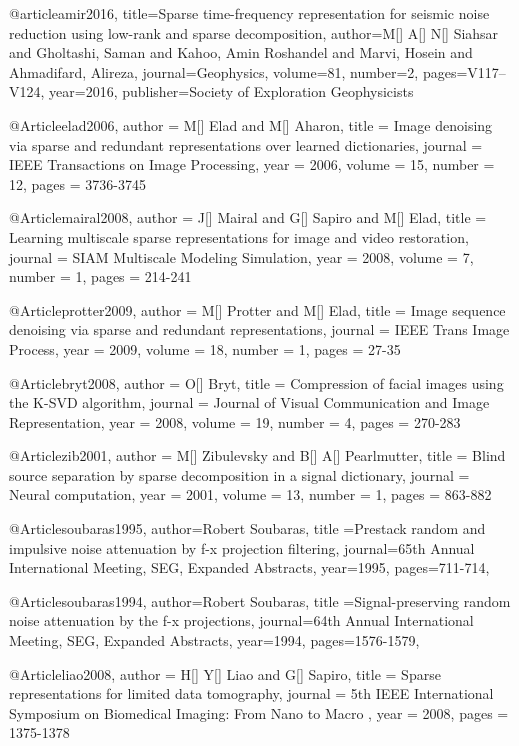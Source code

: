 @article{amir2016,
  title={Sparse time-frequency representation for seismic noise reduction using low-rank and sparse decomposition},
  author={M[] A[] N[] Siahsar and Gholtashi, Saman and Kahoo, Amin Roshandel and Marvi, Hosein and Ahmadifard, Alireza},
  journal={Geophysics},
  volume={81},
  number={2},
  pages={V117--V124},
  year={2016},
  publisher={Society of Exploration Geophysicists}
}

@Article{elad2006,
  author = 	 {M[] Elad and M[] Aharon},
  title = 	 {Image denoising via sparse and redundant representations over learned dictionaries},
  journal = 	 {IEEE Transactions on Image Processing},
  year = 	 2006,
  volume = 	 15,
  number = 	 12,
  pages = 	 {3736-3745}}

@Article{mairal2008,
  author = 	 {J[] Mairal and G[] Sapiro and M[] Elad},
  title = 	 {Learning multiscale sparse representations for image and video restoration},
  journal = 	 {SIAM Multiscale Modeling Simulation},
  year = 	 2008,
  volume = 	 7,
  number = 	 1,
  pages = 	 {214-241}}


@Article{protter2009,
  author = 	 {M[] Protter and M[] Elad},
  title = 	 {Image sequence denoising via sparse and redundant representations},
  journal = 	 {IEEE Trans Image Process},
  year = 	 2009,
  volume = 	 18,
  number = 	 1,
  pages = 	 {27-35}}

@Article{bryt2008,
  author = 	 {O[] Bryt},
  title = 	 {Compression of facial images using the {K}-{SVD} algorithm},
  journal = 	 {Journal of Visual Communication and Image Representation},
  year = 	 2008,
  volume = 	 19,
  number = 	 4,
  pages = 	 {270-283}}

@Article{zib2001,
  author = 	 {M[] Zibulevsky and B[] A[] Pearlmutter},
  title = 	 {Blind source separation by sparse decomposition in a signal dictionary},
  journal = 	 {Neural computation},
  year = 	 2001,
  volume = 	 13,
  number = 	 1,
  pages = 	 {863-882}}

@Article{soubaras1995,
  author={Robert Soubaras},
  title ={Prestack random and impulsive noise attenuation by f-x projection filtering},
  journal={65th Annual International Meeting, SEG, Expanded Abstracts},
  year=1995,
  pages={711-714},
}

@Article{soubaras1994,
  author={Robert Soubaras},
  title ={Signal-preserving random noise attenuation by the f-x projections},
  journal={64th Annual International Meeting, SEG, Expanded Abstracts},
  year=1994,
  pages={1576-1579},
}

@Article{liao2008,
  author = 	 {H[] Y[] Liao and G[] Sapiro},
  title = 	 {Sparse representations for limited data tomography},
  journal = 	 {5th IEEE International Symposium on Biomedical Imaging: From Nano to Macro },
  year = 	 2008,
  pages = 	 {1375-1378}}

